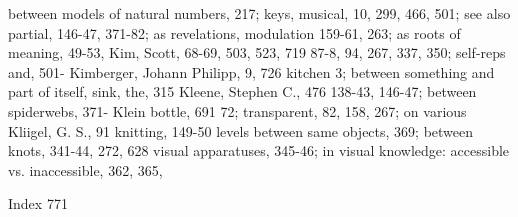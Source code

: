 between models of natural numbers, 217;         keys, musical, 10, 299, 466, 501; see also
partial, 146-47, 371-82; as revelations,        modulation
159-61, 263; as roots of meaning, 49-53,        Kim, Scott, 68-69, 503, 523, 719
87-8, 94, 267, 337, 350; self-reps and, 501-    Kimberger, Johann Philipp, 9, 726 kitchen
3; between something and part of itself,        sink, the, 315 Kleene, Stephen C., 476
138-43, 146-47; between spiderwebs, 371-        Klein bottle, 691
72; transparent, 82, 158, 267; on various       Kliigel, G. S., 91 knitting, 149-50
levels between same objects, 369; between       knots, 341-44, 272, 628
visual apparatuses, 345-46; in visual           knowledge: accessible vs. inaccessible,
                                                362, 365,



Index                                                                                     771

